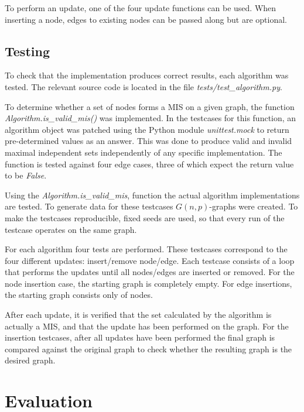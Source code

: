 \documentclass[letterpaper,11pt]{article}
\begin{document}
To perform an update, one of the four update functions can be used. When
inserting a node, edges to existing nodes can be passed along but are optional.


\subsection{Testing}

To check that the implementation produces correct results, each algorithm was
tested. The relevant source code is located in the file
\textit{tests/test\_algorithm.py}.

To determine whether a set of nodes forms a MIS on a given graph, the function
\textit{Algorithm.is\_valid\_mis()} was implemented. In the testcases for this
function, an algorithm object was patched using the Python module
\textit{unittest.mock} to return pre-determined values as an answer. This was
done to produce valid and invalid maximal independent sets independently of any
specific implementation. The function is tested against four edge cases, three
of which expect the return value to be \textit{False}.

Using the \textit{Algorithm.is\_valid\_mis}, function the actual algorithm
implementations are tested.  To generate data for these testcases $G(n,
p)$-graphs were created. To make the testcases reproducible, fixed seeds are
used, so that every run of the testcase operates on the same graph.

For each algorithm four tests are performed.  These testcases correspond to the
four different updates: insert/remove node/edge.  Each testcase consists of a
loop that performs the updates until all nodes/edges are inserted or removed.
For the node insertion case, the starting graph is completely empty. For edge
insertions, the starting graph consists only of nodes.

After each update, it is verified that the set calculated by the algorithm is
actually a MIS, and that the update has been performed on the graph. For the
insertion testcases, after all updates have been performed the final graph is
compared against the original graph to check whether the resulting graph is the
desired graph.


\section{Evaluation}
\label{Evaluation}
\end{document}
